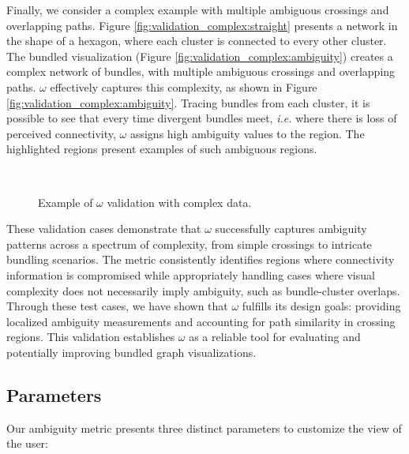 Finally, we consider a complex example with multiple ambiguous crossings and overlapping paths. Figure \ref{fig:validation_complex:straight} presents a network in the shape of a hexagon, where each cluster is connected to every other cluster. The bundled visualization (Figure \ref{fig:validation_complex:ambiguity}) creates a complex network of bundles, with multiple ambiguous crossings and overlapping paths. $\omega$ effectively captures this complexity, as shown in Figure \ref{fig:validation_complex:ambiguity}. Tracing bundles from each cluster, it is possible to see that every time divergent bundles meet, \textit{i.e.} where there is loss of perceived connectivity, $\omega$ assigns high ambiguity values to the region. The highlighted regions present examples of such ambiguous regions.

\begin{figure}[ht]
\centering
{}
\\
\caption{Example of $\omega$ validation with complex data.}
\end{figure}


These validation cases demonstrate that $\omega$ successfully captures ambiguity patterns across a spectrum of complexity, from simple crossings to intricate bundling scenarios. The metric consistently identifies regions where connectivity information is compromised while appropriately handling cases where visual complexity does not necessarily imply ambiguity, such as bundle-cluster overlaps. Through these test cases, we have shown that $\omega$ fulfills its design goals: providing localized ambiguity measurements and accounting for path similarity in crossing regions. This validation establishes $\omega$ as a reliable tool for evaluating and potentially improving bundled graph visualizations.


\subsection{Parameters}

Our ambiguity metric presents three distinct parameters to customize the view of the user:

